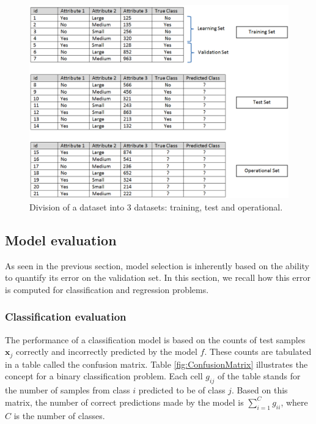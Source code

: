 \begin{figure}[h!]
	\centering
	\includegraphics[width=0.75\linewidth]{images/Dataset}
	\caption{Division of a dataset into 3 datasets: training, test and operational.}
	\label{fig:Dataset}
\end{figure}




\subsection{Model evaluation}

As seen in the previous section, model selection is inherently based on the ability to quantify its error on the validation set. In this section, we recall how this error is computed for classification and regression problems.

\subsubsection{Classification evaluation}
\label{sec:ClassificationEvaluation}
The performance of a classification model is based on the counts of test samples $\textbf{x}_j$ correctly and incorrectly predicted by the model $f$. These counts are tabulated in a table called the confusion matrix. Table \ref{fig:ConfusionMatrix} illustrates the concept for a binary classification problem. Each cell $g_{ij}$ of the table stands for the number of samples from class $i$ predicted to be of class $j$. Based on this matrix, the number of correct predictions made by the model is $\sum_{i=1}^C g_{ii}$, where $C$ is the number of classes. %


